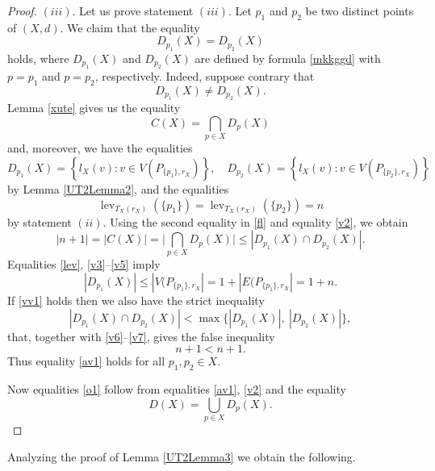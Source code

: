 \documentclass{raex}
\theoremstyle{definition}
\theoremstyle{remark}
\numberwithin{equation}{section}
\begin{document}
\begin{proof}
$(iii)$.
Let us prove statement $(iii)$. Let $p_1$ and $p_2$ be two distinct points of $(X,d)$.
We claim that the equality
\begin{equation}
    \label{av1}
D_{p_1}(X)=D_{p_2}(X) 
\end{equation}
holds, where 
 \(D_{p_1}(X)\) and \(D_{p_2}(X)\) are defined
by formula \eqref{mkkggd} with \(p=p_1\) and \(p=p_2\), respectively.
Indeed, suppose contrary that
\begin{equation}
    \label{vv1}
D_{p_1}(X)\ne D_{p_2}(X).
\end{equation}
Lemma \ref{xute} gives us the equality
\begin{equation}
    \label{v2}
C(X)=\bigcap_{p\in X}D_p(X) 
\end{equation}
and, 
moreover, we have the equalities
\begin{equation}
    \label{v3}
D_{p_1}(X)
=
\left\{
l_X(v) : v\in V(P_{\{p_1\},r_X})
\right\}, 
\quad
D_{p_2}(X)
=
\left\{
l_X(v) : v\in V(P_{\{p_2\},r_X})
\right\}
\end{equation}
by Lemma \ref{UT2Lemma2}, and the equalities
\begin{equation}
    \label{v5}
\operatorname{lev}_{T_X(r_X)}(\{p_1\})=\operatorname{lev}_{T_X(r_X)}(\{p_2\})=n
\end{equation}
by statement $(ii)$.
Using the second equality in \eqref{fl}
and equality \eqref{v2}, we obtain
\begin{equation}
    \label{v6}
|n+1|
=
|C(X)|
=
\big|\bigcap_{p\in X}D_p(X)\big|\leq
|D_{p_1}(X)\cap D_{p_2}(X)|. 
\end{equation}
Equalities \eqref{lev}, \eqref{v3}--\eqref{v5} imply 
\begin{equation}
\label{v7}
|D_{p_1}(X)|\leq |V(P_{\{p_1\},r_X}|=1+|E(P_{\{p_1\},r_X}|=1+n.
\end{equation}
If \eqref{vv1} holds then we also have the strict inequality
\begin{equation*}
|D_{p_1}(X)\cap D_{p_2}(X)|
<
\max\{|D_{p_1}(X)|,\ |D_{p_2}(X)|\},
\end{equation*}
that, together with 
\eqref{v6}--\eqref{v7}, gives the false inequality
\[
n+1<n+1.
\]
Thus equality \eqref{av1} holds for all \(p_1,p_2\in X\).

Now equalities \eqref{o1} follow from equalities \eqref{av1}, \eqref{v2} and
the equality
\[
D(X)=\bigcup_{p\in X}D_p(X).
\]
\end{proof}




Analyzing the proof of Lemma \ref{UT2Lemma3} we obtain the
following.
\end{document}
